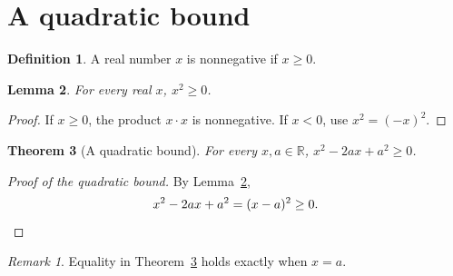 \documentclass[11pt]{article}
\newtheorem{theorem}{Theorem}[section]
\newtheorem{lemma}[theorem]{Lemma}
\theoremstyle{definition}
\newtheorem{definition}[theorem]{Definition}
\theoremstyle{remark}
\newtheorem*{remark}{Remark}
\begin{document}
\section{A quadratic bound}
\begin{definition}\label{def:nonnegative}
A real number $x$ is nonnegative if $x\ge0$.
\end{definition}
\begin{lemma}\label{lem:square}
For every real $x$, $x^2\ge0$.
\end{lemma}
\begin{proof}
If $x\ge0$, the product $x\cdot x$ is nonnegative.
If $x<0$, use $x^2=(-x)^2$.
\end{proof}
\begin{theorem}[A quadratic bound]\label{thm:bound}
For every $x,a\in\mathbb{R}$, $x^2-2ax+a^2\ge0$.
\end{theorem}
\begin{proof}[Proof of the quadratic bound]
By Lemma~\ref{lem:square},
\begin{equation*}
x^2-2ax+a^2=(x-a)^2\ge0.\qedhere
\end{equation*}
\end{proof}
\begin{remark}
Equality in Theorem~\ref{thm:bound} holds exactly when $x=a$.
\end{remark}
\end{document}
